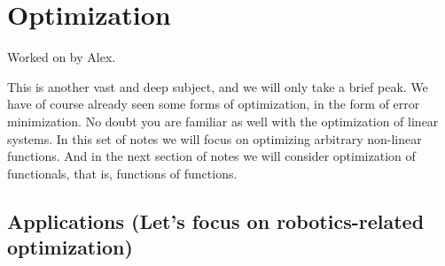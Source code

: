 \chapter{Optimization}

Worked on by Alex.

This is another vast and deep subject, and we will only take a brief peak. We have of course already seen some forms of optimization, in the form of error minimization. No doubt you are familiar as well with the optimization of linear systems. In this set of notes we will focus on optimizing arbitrary non-linear functions. And in the next section of notes we will consider optimization of functionals, that is, functions of functions.

\section{Applications (Let's focus on robotics-related optimization)}
